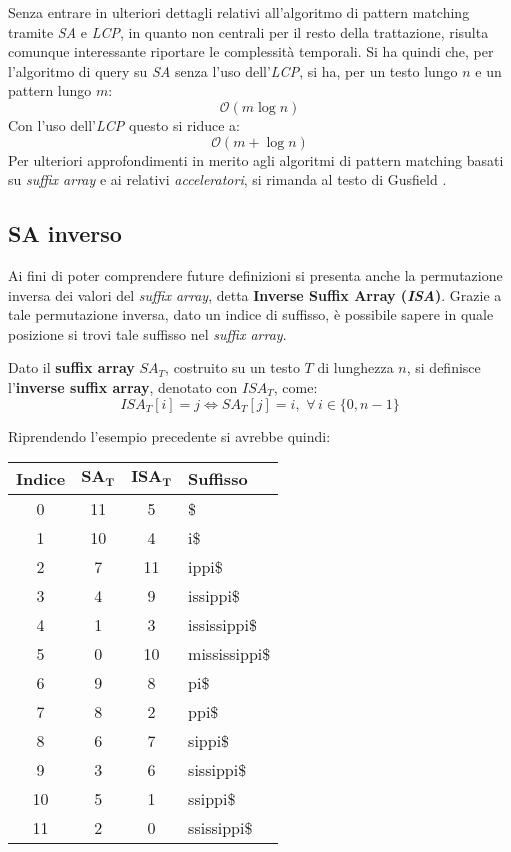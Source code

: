 Senza entrare in ulteriori dettagli relativi all'algoritmo di pattern matching
tramite \textit{SA} e \textit{LCP}, in quanto non centrali per il resto della
trattazione, risulta comunque interessante riportare le complessità
temporali. Si ha quindi che, per l'algoritmo di query su \textit{SA} senza l'uso
dell'\textit{LCP}, si ha, per un testo lungo $n$ e un pattern lungo $m$:
\begin{equation}
  \label{eq:satime}
  \mathcal{O}(m\log n)
\end{equation}
Con l'uso dell'\textit{LCP} questo si riduce a:
\begin{equation}
  \label{eq:salcptime}
  \mathcal{O}(m+\log n)
\end{equation}
Per ulteriori approfondimenti in merito agli algoritmi di pattern matching
basati su \textit{suffix array} e ai relativi \textit{acceleratori}, si rimanda
al testo di Gusfield \cite{gusfield1997}.
\subsection{SA inverso}
Ai fini di poter comprendere future definizioni si presenta anche la
permutazione inversa dei valori del \textit{suffix array}, detta
\textbf{Inverse Suffix Array (\textit{ISA})}. Grazie a tale permutazione
inversa, dato un indice di suffisso, è possibile sapere in quale posizione si
trovi tale suffisso nel \textit{suffix array}.  
\begin{definizione}
  Dato il \textbf{suffix array} $SA_T$, costruito su un testo $T$ di lunghezza
  $n$, si definisce l'\textbf{inverse suffix array}, denotato con $ISA_T$, come:
  \begin{equation}
    \label{eq:isadef}
    ISA_T[i]=j\iff SA_T[j]=i,\,\,\forall\, i\in\{0,n-1\}
  \end{equation}
\end{definizione}

\begin{esempio}
  Riprendendo l'esempio precedente si avrebbe quindi:
  \begin{table}[H]
    \centering
    \footnotesize
    \begin{tabular}{c|c|c|l} 
      \textbf{Indice} & $\mathbf{SA_T}$ & $\mathbf{ISA_T}$ & \textbf{Suffisso}\\ 
      \hline
      0 & 11 & 5 & \$\\
      1 & 10 & 4 & i\$\\
      2 & 7 & 11 & ippi\$\\
      3 & 4 & 9 & issippi\$\\
      4 & 1 & 3 & ississippi\$\\
      5 & 0 & 10 & mississippi\$\\
      6 & 9 & 8 & pi\$\\
      7 & 8 & 2 & ppi\$\\
      8 & 6 & 7 & sippi\$\\
      9 & 3 & 6 & sissippi\$\\
      10 & 5 & 1 & ssippi\$\\
      11 & 2 & 0 & ssissippi\$\\
    \end{tabular}
  \end{table}
\end{esempio}
